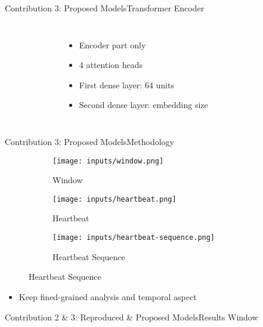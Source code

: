 \begin{frame}{Contribution 3: Proposed Models}{Transformer Encoder}
    \begin{columns}
        \begin{figure}
            
        \end{figure}

        \begin{itemize}
            \item Encoder part only
            \item 4 attention heads
            \item First dense layer: 64 units
            \item Second dense layer: embedding size
        \end{itemize}
    \end{columns}
\end{frame}

\begin{frame}{Contribution 3: Proposed Models}{Methodology}
    \begin{figure}
        \centering
        \begin{subfigure}{0.3\columnwidth}
            \centering
            \caption{Window}
            \texttt{[image: inputs/window.png]}
        \end{subfigure}
        \begin{subfigure}{0.3\columnwidth}
            \centering
            \caption{Heartbeat}
            \texttt{[image: inputs/heartbeat.png]}
        \end{subfigure}

        \begin{subfigure}{0.3\columnwidth}
            \centering
            \caption{Heartbeat Sequence}
            \texttt{[image: inputs/heartbeat-sequence.png]}
        \end{subfigure}
    \end{figure}

    \begin{itemize}
        \item Keep fined-grained analysis and temporal aspect
    \end{itemize}
\end{frame}

\begin{frame}{Contribution 2 \& 3: Reproduced \& Proposed Models}{Results}
    \centering
    Window
    \begin{figure}
        
        \hfill
        
    \end{figure}
\end{frame}

